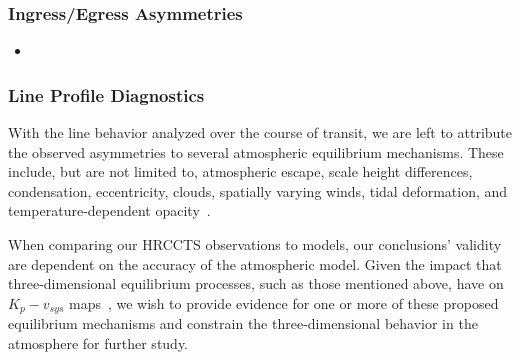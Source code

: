 \documentclass[twocolumn]{aastex631}
\begin{document}
            \subsubsection{Ingress/Egress Asymmetries}\label{subsubsec:Ingress/Egress Asymmetries}
                \begin{itemize}
                    \item 
                \end{itemize}
                
            \subsubsection{Line Profile Diagnostics}\label{subsubsec:Wind Profile Diagnostics}
                With the line behavior analyzed over the course of transit, we are left to attribute the observed asymmetries to several atmospheric equilibrium mechanisms. These include, but are not limited to, atmospheric escape, scale height differences, condensation, eccentricity, clouds, spatially varying winds, tidal deformation, and temperature-dependent opacity~\citep{Savel2023}. 

                When comparing our HRCCTS observations to models, our conclusions' validity are dependent on the accuracy of the atmospheric model. Given the impact that three-dimensional equilibrium processes, such as those mentioned above, have on $K_p-v_{sys}$ maps~\citep{Wardenier2021}, we wish to provide evidence for one or more of these proposed equilibrium mechanisms and constrain the three-dimensional behavior in the atmosphere for further study.
\end{document}
